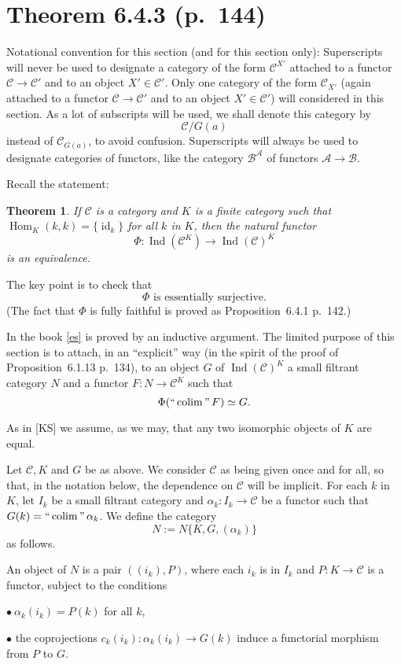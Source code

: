 \documentclass[12pt]{article}
\newtheorem{thm}{Theorem}
\theoremstyle{remark}%
\newcommand{\bu}{\bullet}
\newcommand{\n}{\noindent}
\newcommand{\A}{\mathcal A}
\newcommand{\B}{\mathcal B}
\newcommand{\C}{\mathcal C}
\newcommand{\be}{\begin{equation}}
\newcommand{\ee}{\end{equation}}
\newcommand{\pr}{Proposition}
\DeclareMathOperator*{\coli}{colim}
\DeclareMathOperator*{\ic}{``\coli"}
\DeclareMathOperator{\id}{id}
\DeclareMathOperator{\h}{Hom}
\DeclareMathOperator{\Ind}{Ind}
\begin{document}
\section{Theorem 6.4.3 (p.~144)}%
% 
Notational convention for this section (and for this section only): Superscripts will never be used to designate a category of the form $\C^{X'}$ attached to a functor $\C\to\C'$ and to an object $X'\in\C'$. Only one category of the form $\C_{X'}$ (again attached to a functor $\C\to\C'$ and to an object $X'\in\C'$) will considered in this section. As a lot of subscripts will be used, we shall denote this category by 
%
\be\label{slice}
\C/G(a)
\ee
%
instead of $\C_{G(a)}$, to avoid confusion. Superscripts will always be used to designate categories of functors, like the category $\B^\A$ of functors $\A\to\B$. 

Recall the statement: 
%
\begin{thm}
If $\C$ is a category and $K$ is a finite category such that $\h_K(k,k)=\{\id_k\}$ for all $k$ in $K$, then the natural functor 
$$
\Phi:\Ind(\C^K)\to\Ind(\C)^K
$$ 
is an equivalence.
\end{thm}
%

The key point is to check that 
%
\be\label{es} 
\Phi\text{ is essentially surjective.} 
\ee 
%
(The fact that $\Phi$ is fully faithful is proved as \pr\ 6.4.1 p.~142.) 

In the book \eqref{es} is proved by an inductive argument. The limited purpose of this section is to attach, in an ``explicit'' way (in the spirit of the proof of \pr\ 6.1.13 p.~134), to an object $G$ of $\Ind(\C)^K$ a small filtrant category $N$ and a functor $F:N\to\C^K$ such that 
$$ 
\Phi(\ic F)\simeq G. 
$$ 

As in [KS] we assume, as we may, that any two isomorphic objects of $K$ are equal. 

Let $\C,K$ and $G$ be as above. We consider $\C$ as being given once and for all, so that, in the notation below, the dependence on $\C$ will be implicit. For each $k$ in $K$, let $I_k$ be a small filtrant category and $\alpha_k:I_k\to\C$ be a functor such that $G(k)=\ic\alpha_k$. We define the category 
$$
N:=N\{K,G,(\alpha_k)\}
$$ 
as follows. 

An object of $N$ is a pair $((i_k),P)$, where each $i_k$ is in $I_k$ and $P:K\to\C$ is a functor, subject to the conditions 

\n$\bu\ \alpha_k(i_k)=P(k)$ for all $k$, 

\n$\bu$ the coprojections $c_k(i_k):\alpha_k(i_k)\to G(k)$ induce a functorial morphism from $P$ to $G$. 
\end{document}
